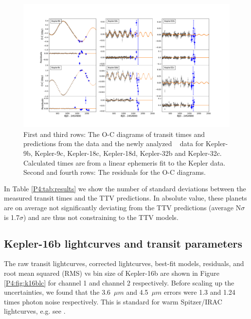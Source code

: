 \begin{figure}
    \centering
    \includegraphics[trim=110 70 110 90, clip, width = \textwidth]{TTVs.pdf}
    \caption{First and third rows: The O-C diagrams of transit times and predictions from the \Kepler data and the newly analyzed \spitzer~ data for Kepler-9b, Kepler-9c, Kepler-18c, Kepler-18d, Kepler-32b and Kepler-32c. Calculated times are from a linear ephemeris fit to the Kepler data. Second and fourth rows: The residuals for the O-C diagrams.}
    \label{P4:fig:TTVs}
\end{figure}

In Table \ref{P4:tab:results} we show the number of standard deviations between the measured transit times and the TTV predictions. In absolute value, these planets are on average not significantly deviating from the TTV predictions (average N$\sigma$ is 1.7$\sigma$) and are thus not constraining to the TTV models.

\subsection{Kepler-16b lightcurves and transit parameters}

The raw transit lightcurves, corrected lightcurves, best-fit models, residuals, and root mean squared (RMS) vs bin size of Kepler-16b are shown in Figure \ref{P4:fig:k16blc} for channel 1 and channel 2 respectively. Before scaling up the uncertainties, we found that the 3.6~$\mu m$ and 4.5~$\mu m$ errors were 1.3 and 1.24 times photon noise respectively. This is standard for warm Spitzer/IRAC lightcurves, e.g. see \citet{Baxter2021}.

